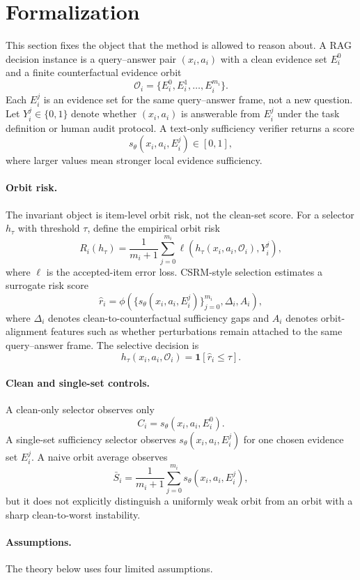 \section{Formalization}
\label{sec:formalization}

This section fixes the object that the method is allowed to reason about.  A
RAG decision instance is a query--answer pair $(x_i, a_i)$ with a clean evidence
set $E_i^0$ and a finite counterfactual evidence orbit
\[
  \mathcal{O}_i = \{E_i^0, E_i^1, \ldots, E_i^{m_i}\}.
\]
Each $E_i^j$ is an evidence set for the same query--answer frame, not a new
question.  Let $Y_i^j \in \{0,1\}$ denote whether $(x_i,a_i)$ is answerable from
$E_i^j$ under the task definition or human audit protocol.  A text-only
sufficiency verifier returns a score
\[
  s_\theta(x_i,a_i,E_i^j) \in [0,1],
\]
where larger values mean stronger local evidence sufficiency.

\paragraph{Orbit risk.}
The invariant object is item-level orbit risk, not the clean-set score.  For a
selector $h_\tau$ with threshold $\tau$, define the empirical orbit risk
\[
  R_i(h_\tau) =
  \frac{1}{m_i + 1}
  \sum_{j=0}^{m_i}
  \ell(h_\tau(x_i,a_i,\mathcal{O}_i), Y_i^j),
\]
where $\ell$ is the accepted-item error loss.  CSRM-style selection estimates a
surrogate risk score
\[
  \widehat r_i = \phi\!\left(
    \{s_\theta(x_i,a_i,E_i^j)\}_{j=0}^{m_i},
    \Delta_i,
    A_i
  \right),
\]
where $\Delta_i$ denotes clean-to-counterfactual sufficiency gaps and $A_i$
denotes orbit-alignment features such as whether perturbations remain attached
to the same query--answer frame.  The selective decision is
\[
  h_\tau(x_i,a_i,\mathcal{O}_i) = \mathbf{1}[\widehat r_i \le \tau].
\]

\paragraph{Clean and single-set controls.}
A clean-only selector observes only
\[
  C_i = s_\theta(x_i,a_i,E_i^0).
\]
A single-set sufficiency selector observes $s_\theta(x_i,a_i,E_i^j)$ for one
chosen evidence set $E_i^j$.  A naive orbit average observes
\[
  \bar S_i = \frac{1}{m_i + 1}\sum_{j=0}^{m_i}s_\theta(x_i,a_i,E_i^j),
\]
but it does not explicitly distinguish a uniformly weak orbit from an orbit with
a sharp clean-to-worst instability.

\paragraph{Assumptions.}
The theory below uses four limited assumptions.

